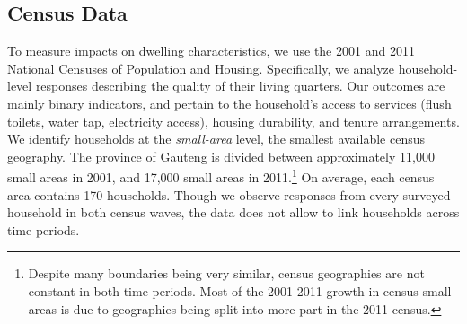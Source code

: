 \documentclass[12pt]{article}
\begin{document}
\subsection{Census Data}

To measure impacts on dwelling characteristics, we use the 2001 and 2011 National Censuses of Population and Housing. Specifically, we analyze household-level responses describing the quality of their living quarters. Our outcomes are mainly binary indicators, and pertain to the household's access to services (flush toilets, water tap, electricity access), housing durability, and tenure arrangements. We identify households at the {\it small-area} level, the smallest available census geography. The province of Gauteng is divided between approximately 11,000 small areas in 2001, and 17,000 small areas in 2011.\footnote{Despite many boundaries being very similar, census geographies are not constant in both time periods. Most of the 2001-2011 growth in census small areas is due to geographies being split into more part in the 2011 census.} On average, each census area contains 170 households. Though we observe responses from every surveyed household in both census waves, the data does not allow to link households across time periods. 
\end{document}
